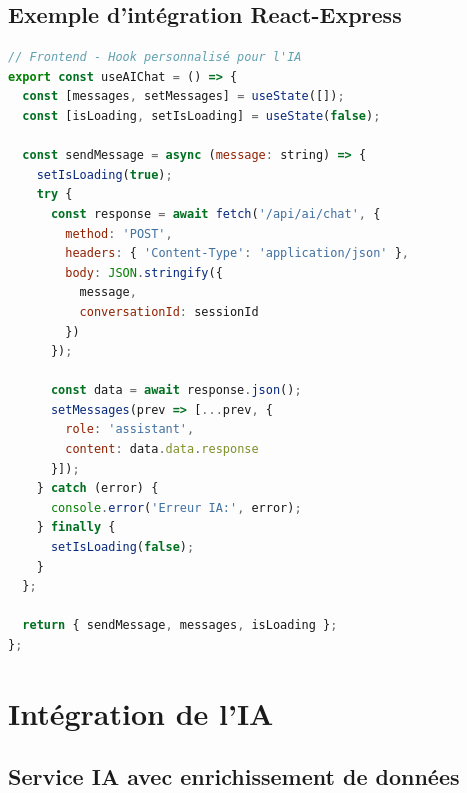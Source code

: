 \documentclass[12pt,a4paper]{report}
\begin{document}
\subsection{Exemple d'intégration React-Express}

\begin{lstlisting}[caption=Hook personnalisé pour l'IA côté frontend, language=javascript]
// Frontend - Hook personnalisé pour l'IA
export const useAIChat = () => {
  const [messages, setMessages] = useState([]);
  const [isLoading, setIsLoading] = useState(false);
  
  const sendMessage = async (message: string) => {
    setIsLoading(true);
    try {
      const response = await fetch('/api/ai/chat', {
        method: 'POST',
        headers: { 'Content-Type': 'application/json' },
        body: JSON.stringify({
          message,
          conversationId: sessionId
        })
      });
      
      const data = await response.json();
      setMessages(prev => [...prev, {
        role: 'assistant',
        content: data.data.response
      }]);
    } catch (error) {
      console.error('Erreur IA:', error);
    } finally {
      setIsLoading(false);
    }
  };
  
  return { sendMessage, messages, isLoading };
};
\end{lstlisting}

\section{Intégration de l'IA}

\subsection{Service IA avec enrichissement de données}
\end{document}
